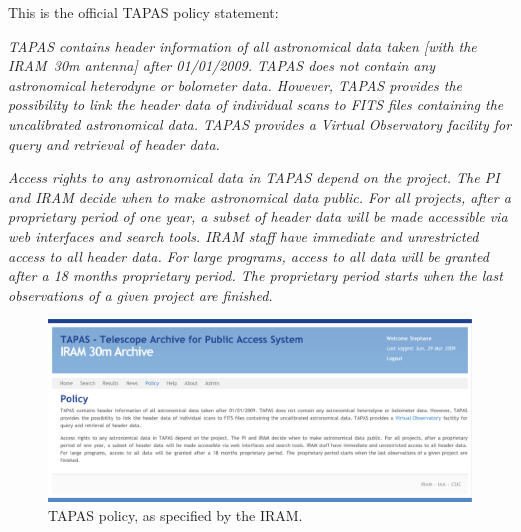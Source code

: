 			This is the official TAPAS policy statement:
			
			\begin{adjustwidth}{\parindent}{\parindent}
				\emph{TAPAS contains header information of all
				astronomical data taken [with the IRAM~30m antenna]
				after 01/01/2009. TAPAS does not contain any
				astronomical heterodyne or bolometer data. However,
				TAPAS provides the possibility to link the header
				data of individual scans to FITS files containing
				the uncalibrated astronomical data. TAPAS provides
				a Virtual Observatory facility for query and
				retrieval of header data.}
				
				\emph{Access rights to any astronomical data in TAPAS
				depend on the project. The PI and IRAM decide when
				to make astronomical data public. For all projects,
				after a proprietary period of one year, a subset of
				header data will be made accessible via web
				interfaces and search tools. IRAM staff have
				immediate and unrestricted access to all header
				data. For large programs, access to all data will
				be granted after a 18 months proprietary period.
				The proprietary period starts when the last
				observations of a given project are finished.}
			\end{adjustwidth}
			
			
			
			
			\begin{figure}[tbp]
				\centering
					\includegraphics[width=\textwidth]
					{fig/TAPAS_policy.pdf}
				\caption[TAPAS policy]
				{TAPAS policy, as specified by the IRAM.}
				\label{fig:fig_TAPAS_policy}
			\end{figure}
			
